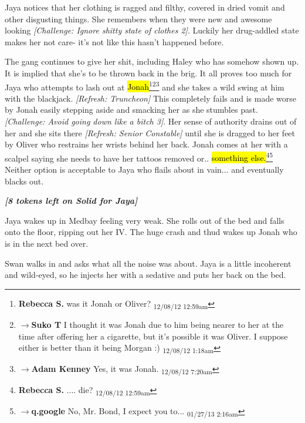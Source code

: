 Jaya notices that her clothing is ragged and filthy, covered in dried vomit and other disgusting things.  She remembers when they were new and awesome looking \textit{{[}Challenge: Ignore shitty state of clothes 2{]}}.  Luckily her drug-addled state makes her not care- it's not like this hasn't happened before. 



The gang continues to give her shit, including Haley who has somehow shown up.  It is implied that she's to be thrown back in the brig.  It all proves too much for Jaya who attempts to lash out at \hl{Jonah}\footnote{\textbf{Rebecca S. }was it Jonah or Oliver? \textsubscript{12/08/12 12:59am}}\footnote{$\rightarrow$\textbf{Suko T }I thought it was Jonah due to him being nearer to her at the time after offering her a cigarette, but it's possible it was Oliver.  I suppose either is better than it being Morgan :) \textsubscript{12/08/12 1:18am}}\footnote{$\rightarrow$\textbf{Adam Kenney }Yes, it was Jonah. \textsubscript{12/08/12 7:20am}} and she takes a wild swing at him with the blackjack. \textit{{[}Refresh: Truncheon{]} } This completely fails and is made worse by Jonah easily stepping aside and smacking her as she stumbles past.  \textit{{[}Challenge: Avoid going down like a bitch 3{]}}.  Her sense of authority drains out of her and she sits there \textit{{[}Refresh: Senior Constable{]} }until she is dragged to her feet by Oliver who restrains her wrists behind her back.  Jonah comes at her with a scalpel saying she needs to have her tattoos removed or.. \hl{something else.}\footnote{\textbf{Rebecca S. }.... die? \textsubscript{12/08/12 12:59am}}\footnote{$\rightarrow$\textbf{q.google }No, Mr. Bond, I expect you to... \textsubscript{01/27/13 2:16am}}  Neither option is acceptable to Jaya who flails about in vain... and eventually blacks out.



\textit{\textbf{{[}8 tokens left on Solid for Jaya{]}}}




Jaya wakes up in Medbay feeling very weak.  She rolls out of the bed and falls onto the floor, ripping out her IV.  The huge crash and thud wakes up Jonah who is in the next bed over.



Swan walks in and asks what all the noise was about. Jaya is a little incoherent and wild-eyed, so he injects her with a sedative and puts her back on the bed.



